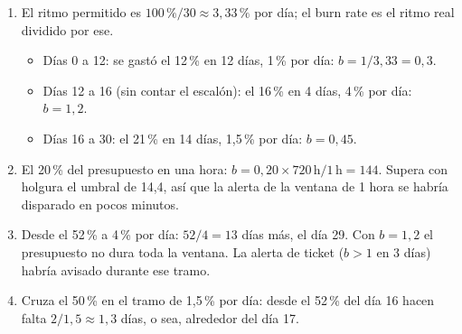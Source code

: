 \documentclass[variant=guia,cover=institutional,mode=screen]{ua-engineering-v6-article}
\begin{document}
\begin{uaanswer}
\begin{enumerate}
\item El ritmo permitido es $100\,\% / 30 \approx 3{,}33\,\%$ por día; el burn rate es el ritmo real dividido por ese.
\begin{itemize}
\item Días 0 a 12: se gastó el 12\,\% en 12 días, 1\,\% por día: $b = 1 / 3{,}33 = 0{,}3$.
\item Días 12 a 16 (sin contar el escalón): el 16\,\% en 4 días, 4\,\% por día: $b = 1{,}2$.
\item Días 16 a 30: el 21\,\% en 14 días, 1,5\,\% por día: $b = 0{,}45$.
\end{itemize}
\item El 20\,\% del presupuesto en una hora: $b = 0{,}20 \times 720\,\text{h} / 1\,\text{h} = 144$. Supera con holgura el umbral de 14,4, así que la alerta de la ventana de 1 hora se habría disparado en pocos minutos.
\item Desde el 52\,\% a 4\,\% por día: $52 / 4 = 13$ días más, el día 29. Con $b = 1{,}2$ el presupuesto no dura toda la ventana. La alerta de ticket ($b > 1$ en 3 días) habría avisado durante ese tramo.
\item Cruza el 50\,\% en el tramo de 1,5\,\% por día: desde el 52\,\% del día 16 hacen falta $2 / 1{,}5 \approx 1{,}3$ días, o sea, alrededor del día 17.
\end{enumerate}
\end{uaanswer}
\end{document}
